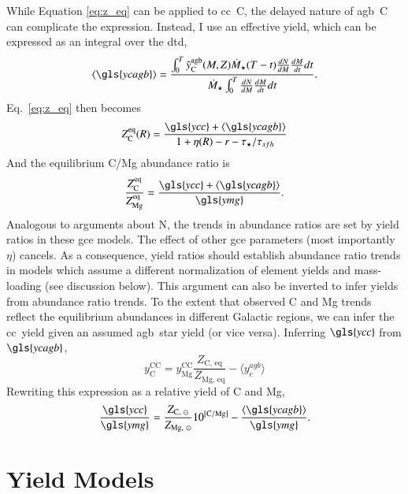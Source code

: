 \documentclass[12pt,oneside,letterpaper]{report}
\newcommand{\cc}{\gls{cc}}
\newcommand{\agb}{\gls{agb}}
\newcommand{\gce}{\gls{gce}}
\newcommand{\Ycc}{\gls{ycc}}
\newcommand{\Yoc}{\gls{ymg}}
\newcommand{\Ycagb}{\gls{ycagb}}
\begin{document}
While Equation \ref{eq:z_eq} can be applied to \cc\ C, the delayed nature of \agb\ C can complicate the expression. Instead, I use an effective yield, which can be expressed as an integral over the \gls{dtd},
\begin{equation}
    \langle \Ycagb\rangle = \frac{\int_0^T \tilde{y}_{\rm C}^{\rm agb}(M, Z) \dot{M}_\star(T - t) \frac{dN}{dM} \frac{dM}{dt} dt  }{ \dot{M}_\star \int_0^T \frac{dN}{dM} \frac{dM}{dt} dt}.
\end{equation}
Eq.~\ref{eq:z_eq} then becomes
\begin{equation}
    Z_{\rm C}^{\rm eq}(R) = \frac{\Ycc + \langle\Ycagb\rangle}{1 + \eta(R) - r - \tau_\star / \tau_{sfh}}
\end{equation}
And the equilibrium C/Mg abundance ratio is
\begin{equation}\label{eq:z_co}
    \frac{Z_{\rm C}^{\rm eq}}{Z_{\rm Mg}^{\rm eq}} = \frac{\Ycc + \langle \Ycagb \rangle }{\Yoc}.
\end{equation}
Analogous to \cite{james+23} arguments about N, the trends in abundance ratios are set by yield ratios in these \gce{} models. The effect of other \gce{} parameters (most importantly $\eta$) cancels. As a consequence, yield ratios should establish abundance ratio trends in models which assume a different normalization of element yields and mass-loading (see discussion below).
This argument can also be inverted to infer  yields from abundance ratio trends. To the extent that observed C and Mg trends reflect the equilibrium abundances in different Galactic regions, we can infer the \cc\ yield given an assumed \agb\ star yield (or vice versa). Inferring $\Ycc$ from $\Ycagb$, 
\begin{equation}
    y_\text{C}^\text{CC} =  y_\text{Mg}^\text{CC} \frac{Z_\text{C,~eq}}{Z_\text{Mg,~eq}} - \langle y_c^{agb} \rangle
\end{equation}
Rewriting this expression as a relative yield of C and Mg,
\begin{equation}\label{eq:y_c_eq}
    \frac{\Ycc}{\Yoc} = \frac{Z_{\text{C},~\odot}}{Z_{\text{Mg},~\odot}} 10^{\rm [C/Mg]} - \frac{\langle \Ycagb \rangle}{\Yoc}.
\end{equation}

\section{Yield Models}
\end{document}
